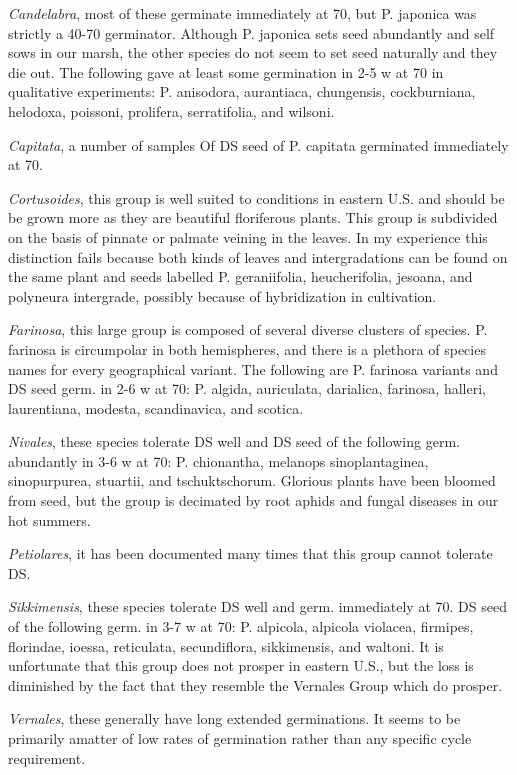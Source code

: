 \begin{description}
\textit{Candelabra}, most of these germinate immediately at
70, but P. japonica was strictly a 40-70 germinator. Although P. japonica sets seed
abundantly and self sows in our marsh, the other species do not seem to set seed
naturally and they die out. The following gave at least some germination in 2-5 w at 70
in qualitative experiments: P. anisodora, aurantiaca, chungensis, cockburniana,
helodoxa, poissoni, prolifera, serratifolia, and wilsoni.

\textit{Capitata}, a number of samples Of DS seed of P. capitata germinated immediately at 70.

\textit{Cortusoides}, this group is
well suited to conditions in eastern U.S. and should be be grown more as they are
beautiful floriferous plants. This group is subdivided on the basis of pinnate or palmate
veining in the leaves. In my experience this distinction fails because both kinds of
leaves and intergradations can be found on the same plant and seeds labelled P.
geraniifolia, heucherifolia, jesoana, and polyneura intergrade, possibly because of
hybridization in cultivation.

\textit{Farinosa}, this large group is composed of several diverse
clusters of species. P. farinosa is circumpolar in both hemispheres, and there is a
plethora of species names for every geographical variant. The following are P.
farinosa variants and DS seed germ. in 2-6 w at 70: P. algida, auriculata, darialica,
farinosa, halleri, laurentiana, modesta, scandinavica, and scotica.

\textit{Nivales}, these
species tolerate DS well and DS seed of the following germ. abundantly in 3-6 w at
70: P. chionantha, melanops sinoplantaginea, sinopurpurea, stuartii, and
tschuktschorum. Glorious plants have been bloomed from seed, but the group is
decimated by root aphids and fungal diseases in our hot summers.

\textit{Petiolares}, it has
been documented many times that this group cannot tolerate DS.

\textit{Sikkimensis}, these
species tolerate DS well and germ. immediately at 70. DS seed of the following germ.
in 3-7 w at 70: P. alpicola, alpicola violacea, firmipes, florindae, ioessa, reticulata,
secundiflora, sikkimensis, and waltoni. It is unfortunate that this group does not
prosper in eastern U.S., but the loss is diminished by the fact that they resemble the
Vernales Group which do prosper.

\textit{Vernales}, these generally have long extended
germinations. It seems to be primarily amatter of low rates of germination rather than
any specific cycle requirement.


\end{description}
